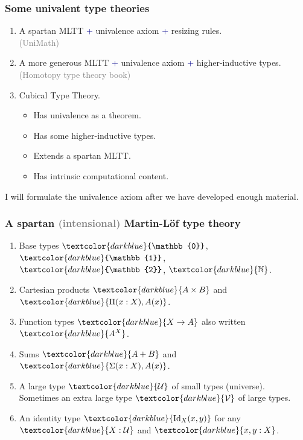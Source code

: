 \documentclass[aspectratio=169]{beamer}
\newcommand{\U}{\operatorname{\mathcal{U}}}
\newcommand{\V}{\operatorname{\mathcal{V}}}
\newcommand{\db}{\textcolor{darkblue}}
\newcommand{\grey}{\textcolor{grey}}
\newcommand{\m}[1]{$\db{#1}$}
\newcommand{\N}{\mathbb{N}}
\newcommand{\Id}{\operatorname{Id}}
\begin{document}
\begin{frame}
  \frametitle{Some univalent type theories}

  \begin{enumerate}
  \vfill \item A spartan MLTT \db{+} univalence axiom \db{+} resizing rules. \\[1ex]
  \grey{(UniMath)}

  \vfill \item A more generous MLTT \db{+} univalence axiom \db{+} higher-inductive types. \\[1ex]
  \grey{(Homotopy type theory book)}

  \vfill \item Cubical Type Theory.\\[1ex]
  \begin{itemize}
  \item  Has univalence as a theorem.
  \item  Has some higher-inductive types.
  \item  Extends a spartan MLTT.
  \item  Has intrinsic computational content.
  \end{itemize}
  \end{enumerate}

  I will formulate the univalence axiom after we have developed enough
  material.

\end{frame}

\begin{frame}
  \frametitle{A spartan \grey{(intensional)} Martin-L\"of type theory}

\vfill

  \begin{enumerate}
  \vfill \item Base types \m{\mathbb{0}}, \m{\mathbb{1}},  \m{\mathbb{2}}, \m{\N}.
  \vfill \item Cartesian products \m{A \times B} and \m{\Pi(x:X), A(x)}.
  \vfill \item Function types \m{X \to A} also written \m{A^X}.
  \vfill \item Sums \m{A + B} and \m{\Sigma(x:X), A(x)}.
  \vfill \item A large type \m{\U} of small types (universe). \\[1ex] Sometimes an extra large type \m{\V} of large types.
  \vfill \item An identity type \m{\Id_X(x,y)} for any \m{X : \U} and \m{x,y:X}. 
\end{enumerate}

\vfill

\end{frame}
\end{document}
